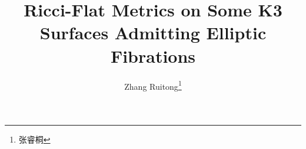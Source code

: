 \documentclass[twosides]{article}
\begin{document}
\title{Ricci-Flat Metrics on Some K3\\ Surfaces Admitting Elliptic Fibrations}
\author{Zhang Ruitong\footnote{张睿桐}}



\tableofcontents







\printbibliography
\end{document}
